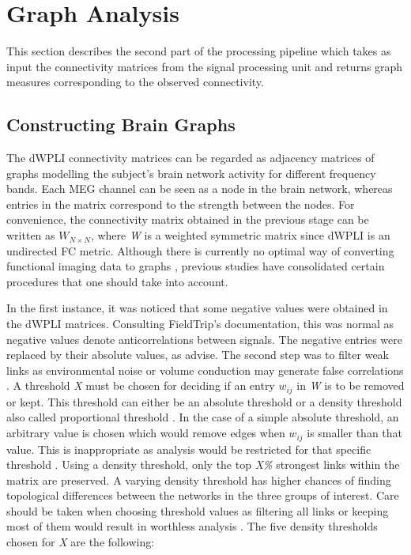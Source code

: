 
	\section{Graph Analysis}

	This section describes the second part of the processing pipeline which takes as input the connectivity matrices from the signal processing unit and returns graph measures corresponding to the observed connectivity.

		\subsection{Constructing Brain Graphs}
		The \ac{dWPLI} connectivity matrices can be regarded as adjacency matrices of graphs modelling the subject's brain network activity for different frequency bands. Each \ac{MEG} channel can be seen as a node in the brain network, whereas entries in the matrix correspond to the strength between the nodes. For convenience, the connectivity matrix obtained in the previous stage can be written as \(W_{N \times N}\), where \textit{W} is a weighted symmetric matrix since \ac{dWPLI} is an undirected \ac{FC} metric. Although there is currently no optimal way of converting functional imaging data to graphs \autocite{StamReijneveld2007}, previous studies have consolidated certain procedures that one should take into account. 

		In the first instance, it was noticed that some negative values were obtained in the \ac{dWPLI} matrices. Consulting FieldTrip's documentation, this was normal as negative values denote anticorrelations between signals. The negative entries were replaced by their absolute values, as \textcite{Fallani2014} advise. The second step was to filter weak links as environmental noise or volume conduction may generate false correlations \autocite{Fallani2014}. A threshold \textit{X} must be chosen for deciding if an entry \(w_{ij}\) in \textit{W} is to be removed or kept. This threshold can either be an absolute threshold or a density threshold also called proportional threshold \autocite{Bullmore2011}. In the case of a simple absolute threshold, an arbitrary value is chosen which would remove edges when \(w_{ij}\) is smaller than that value. This is inappropriate as analysis would be restricted for that specific threshold \autocite{Bullmore2009}. Using a density threshold, only the top \textit{X\%} strongest links within the matrix are preserved. A varying density threshold has higher chances of finding topological differences between the networks in the three groups of interest. Care should be taken when choosing threshold values as filtering all links or keeping most of them would result in worthless analysis \autocite{Achard2007}. The five density thresholds chosen for \textit{X} are the following:

